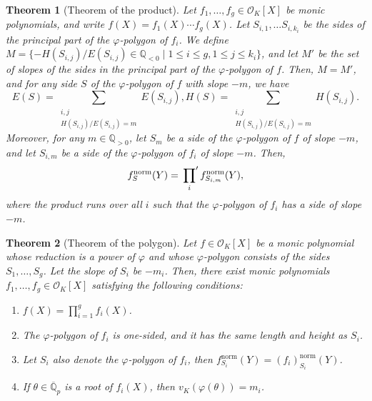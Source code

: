 \documentclass[10pt,a4paper]{amsart}
\newcommand{\field}[1]{\mathbb{#1}}
\newcommand{\Q}{\field{Q}}
\newtheorem{theorem}{Theorem}[section]
\numberwithin{equation}{section}
\begin{document}
    \begin{theorem}[Theorem of the product]\label{thm:theorem of product}
      Let $f_1, \dots ,f_g \in \mathcal{O}_K[X]$ be monic polynomials, and write 
      $f(X) = f_1(X) \cdots f_g(X)$. 
      Let $S_{i,1}, \dots S_{i,k_i}$ be the sides of the principal part of the $\varphi$-polygon 
      of $f_i$. We define $M=\{-H(S_{i,j})/E(S_{i,j}) \in \Q_{< 0} \mid 1 \le i \le g,1 \le j \le k_i\}$, 
      and let $M'$ be the set of slopes of the sides in the principal part of the $\varphi$-polygon of $f$. 
      Then, $M=M'$, and for any side $S$ of the $\varphi$-polygon of $f$ with slope $-m$, we have 
      \[
        E(S)=\sum_{\substack{i,j\\H(S_{i,j})/E(S_{i,j})=m}} E(S_{i,j}), H(S)=\sum_{\substack{i,j\\H(S_{i,j})/E(S_{i,j})=m}} H(S_{i,j}). 
      \]
      Moreover, for any $m \in \Q_{>0}$, let $S_m$ be a side of the $\varphi$-polygon of $f$ of slope $-m$, 
      and let $S_{i,m}$ be a side of the $\varphi$-polygon of $f_i$ of slope $-m$. 
      Then, 
      \[
        f_S^{\mathrm{norm}}(Y) = \sideset{}{'}\prod_{i}f_{S_{i,m}}^{\mathrm{norm}}(Y), 
      \]
      where the product runs over all $i$ such that the $\varphi$-polygon of $f_i$ has a side of slope $-m$. 
    \end{theorem}

    \begin{theorem}[Theorem of the polygon]\label{thm:theorem of the polygon}
      Let $f \in \mathcal{O}_K[X]$ be a monic polynomial whose reduction is a power of $\varphi$ and whose $\varphi$-polygon
      consists of the sides $S_1, \dots ,S_g$. Let the slope of $S_{i}$ be $-m_i$. 
      Then, there exist monic polynomials $f_1, \dots ,f_g \in \mathcal{O}_K[X]$ 
      satisfying the following conditions: 
      \begin{enumerate}
        \item $ f(X) = \displaystyle \prod_{i = 1}^g f_i(X) $. 

        \item The $\varphi$-polygon of $f_i$ is one-sided, and it has the same length and height as $S_{i}$. 

        \item Let $S_{i}$ also denote the $\varphi$-polygon of $f_i$, then $f_{S_{i}}^{\mathrm{norm}}(Y) = (f_i)_{S_{i}}^{\mathrm{norm}}(Y)$. 

        \item If $\theta \in \overline{\Q}_p$ is a root of $f_i(X)$, then $v_K(\varphi(\theta)) = m_i$. 
      \end{enumerate}
    \end{theorem}
\end{document}
